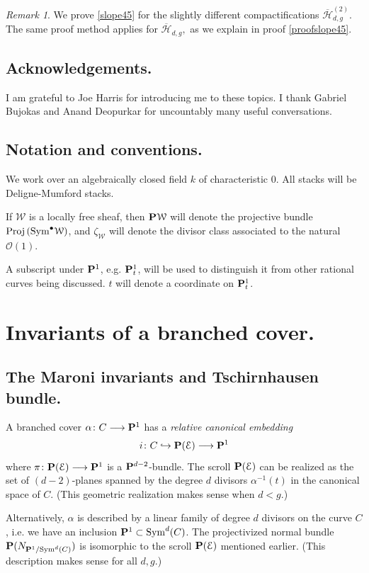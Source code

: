 \documentclass[reqno, 10 pt]{article}
\theoremstyle{definition}
\theoremstyle{remark}
\newtheorem{rmk}[thm]{Remark}
\numberwithin{equation}{section}
\numberwithin{thm}{section}
\numberwithin{prop}{section}
\numberwithin{lem}{section}
\numberwithin{cor}{section}
\numberwithin{conj}{section}
\numberwithin{defn}{section}
\renewcommand{\H}{\mathcal H}
\newcommand{\Hdg}{\overline{\H}_{d,g}}
\newcommand{\Hdgnt}{\overline{\H}_{d,g}^{(2)}}
\renewcommand{\to}{\longrightarrow}
\newcommand{\cE}{{\mathcal E}}
\newcommand{\cO}{{\mathcal O}}
\newcommand{\cW}{{\mathcal W}}
\renewcommand{\P}{{\bf P}}
\newcommand {\from}{{\colon}}
\renewcommand{\H}{{\mathcal{H}}}
\newcommand{\Proj}{{\text{\rm Proj}\,}}
\newcommand {\Sym}{{\rm Sym}}
\begin{document}
\begin{rmk}
We prove \autoref{slope45} for the slightly different compactifications $\Hdgnt$. The same proof method applies for $\Hdg,$ as we explain in proof \ref{proofslope45}.
\end{rmk}


\subsection{Acknowledgements.} I am grateful to Joe Harris for introducing me to these topics. I thank Gabriel Bujokas and Anand Deopurkar for uncountably many useful conversations. 

\subsection{Notation and conventions.} We work over an algebraically closed field $k$ of characteristic $0$. All stacks will be Deligne-Mumford stacks. 

If $\cW$ is a locally free sheaf, then $\P \cW$ will denote the projective bundle $\Proj(\Sym^{\bullet} \cW)$, and $\zeta_{\cW}$ will denote the divisor class associated to the natural $\cO(1)$.

A subscript under $\P^{1}$, e.g. $\P^{1}_{t}$, will be used to distinguish it from other rational curves being discussed. $t$ will denote a coordinate on $\P^{1}_{t}$.



\section{Invariants of a branched cover.}\label{FirstSection}

\subsection{The Maroni invariants and Tschirnhausen bundle.}
A branched cover $\alpha \from C \to \P^{1}$ has a {\sl relative canonical embedding} $$i \from C \hookrightarrow \P(\cE) \to \P^{1}$$ where $\pi \from \P(\cE) \to \P^{1}$ is a $\P^{d-2}$-bundle. The scroll $\P(\cE)$ can be realized as the set of $(d-2)$-planes spanned by the degree $d$ divisors $\alpha^{-1}(t)$ in the canonical space of $C$. (This geometric realization makes sense when $d < g$.)

Alternatively, $\alpha$ is described by a linear family of degree $d$ divisors on the curve $C$, i.e. we have an inclusion $\P^{1} \subset \Sym^{d}(C)$.  The projectivized normal bundle $\P(N_{\P^{1}/\Sym^{d}(C)})$ is isomorphic to the scroll $\P(\cE)$ mentioned earlier. (This description makes sense for all $d, g$.) 
\end{document}
